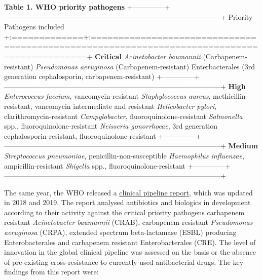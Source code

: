 \documentclass[
]{book}
\begin{document}
\textbf{Table 1. WHO priority pathogens}
+--------------+--------------------------------------------------------------------------------------------+
\textbar{} Priority \textbar{} Pathogens included \textbar{}
+:=============+:===========================================================================================+
\textbar{} \textbf{Critical} \textbar{} \emph{Acinetobacter baumannii} (Carbapenem-resistant) \textbar{}
\textbar{} \textbar{} \textbar{}
\textbar{} \textbar{} \emph{Pseudomonas aeruginosa} (Carbapenem-resistant) \textbar{}
\textbar{} \textbar{} \textbar{}
\textbar{} \textbar{} Enterbacterales (3rd generation cephalosporin, carbapenem-resistant) \textbar{}
+--------------+--------------------------------------------------------------------------------------------+
\textbar{} \textbf{High} \textbar{} \emph{Enterococcus faecium}, vancomycin-resistant \textbar{}
\textbar{} \textbar{} \textbar{}
\textbar{} \textbar{} \emph{Staphylococcus aureus}, methicillin-resistant, vancomycin intermediate and resistant \textbar{}
\textbar{} \textbar{} \textbar{}
\textbar{} \textbar{} \emph{Helicobacter pylori}, clarithromycin-resistant \textbar{}
\textbar{} \textbar{} \textbar{}
\textbar{} \textbar{} \emph{Campylobacter}, fluoroquinolone-resistant \textbar{}
\textbar{} \textbar{} \textbar{}
\textbar{} \textbar{} \emph{Salmonella} spp., fluoroquinolone-resistant \textbar{}
\textbar{} \textbar{} \textbar{}
\textbar{} \textbar{} \emph{Neisseria gonorrhoeae}, 3rd generation cephalosporin-resistant, fluoroquinolone-resistant \textbar{}
+--------------+--------------------------------------------------------------------------------------------+
\textbar{} \textbf{Medium} \textbar{} \emph{Streptococcus pneumoniae}, penicillin-non-susceptible \textbar{}
\textbar{} \textbar{} \textbar{}
\textbar{} \textbar{} \emph{Haemophilus influenzae}, ampicillin-resistant \textbar{}
\textbar{} \textbar{} \textbar{}
\textbar{} \textbar{} \emph{Shigella} spp., fluoroquinolone-resistant \textbar{}
+--------------+--------------------------------------------------------------------------------------------+

The same year, the WHO released a \href{https://apps.who.int/iris/bitstream/handle/10665/330420/9789240000193-eng.pdf}{clinical pipeline report}, which was updated in 2018 and 2019. The report analysed antibiotics and biologics in development according to their activity against the critical priority pathogens carbapenem resistant \emph{Acinetobacter baumannii} (CRAB), carbapenem-resistant \emph{Pseudomonas aeruginosa} (CRPA), extended spectrum beta-lactamase (ESBL) producing Enterobacterales and carbapenem resistant Enterobacterales (CRE). The level of innovation in the global clinical pipeline was assessed on the basis or the absence of pre-existing cross-resistance to currently used antibacterial drugs. The key findings from this report were:
\end{document}
